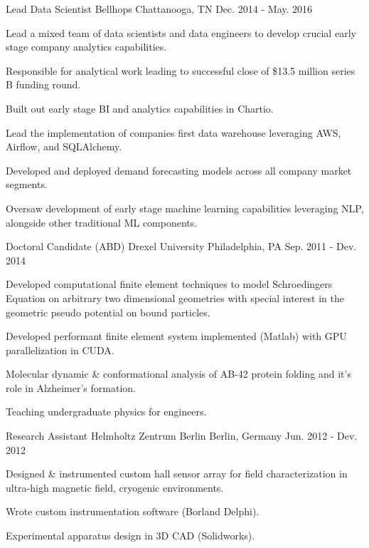 \begin{cventries}
  \cventry
    {Lead Data Scientist} %
    {Bellhops} %
    {Chattanooga, TN} %
    {Dec. 2014 - May. 2016} %
    {
      \begin{cvitems} %
        \item {Lead a mixed team of data scientists and data engineers to develop crucial early stage company analytics capabilities.}
        \item {Responsible for analytical work leading to successful close of \$13.5 million series B funding round.}
        \item {Built out early stage BI and analytics capabilities in Chartio.}
        \item {Lead the implementation of companies first data warehouse leveraging AWS, Airflow, and SQLAlchemy.}
        \item {Developed and deployed demand forecasting models across all company market segments.}
        \item {Oversaw development of early stage machine learning capabilities leveraging NLP, alongside other traditional ML components.}
      \end{cvitems}
    }

  \cventry
    {Doctoral Candidate (ABD)} %
    {Drexel University} %
    {Philadelphia, PA} %
    {Sep. 2011 - Dev. 2014} %
    {
      \begin{cvitems} %
        \item {Developed computational finite element techniques to model Schroedingers Equation on arbitrary two dimensional geometries with special interest in the geometric pseudo potential on bound particles.}
        \item {Developed performant finite element system implemented (Matlab) with GPU parallelization in CUDA.}
        \item {Molecular dynamic \& conformational analysis of AB-42 protein folding and it's role in Alzheimer's formation.}
        \item {Teaching undergraduate physics for engineers.}
      \end{cvitems}
    }

  \cventry
    {Research Assistant} %
    {Helmholtz Zentrum Berlin} %
    {Berlin, Germany} %
    {Jun. 2012 - Dev. 2012} %
    {
      \begin{cvitems} %
        \item {Designed \& instrumented custom hall sensor array for field characterization in ultra-high magnetic field, cryogenic environments.}
        \item {Wrote custom instrumentation software (Borland Delphi).}
        \item {Experimental apparatus design in 3D CAD (Solidworks).}
      \end{cvitems}
    }

\end{cventries}
